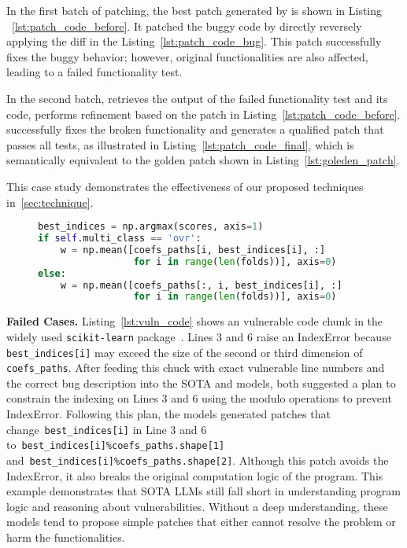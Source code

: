 In the first batch of patching, the best patch generated by \sys is shown in Listing ~\ref{lst:patch_code_before}. It patched the buggy code by directly reversely applying the diff in the Listing~\ref{lst:patch_code_bug}.
This patch successfully fixes the buggy behavior; however, original functionalities are also affected, leading to a failed functionality test.

In the second batch, \sys retrieves the output of the failed functionality test and its code, performs refinement based on the patch in Listing~\ref{lst:patch_code_before}. \sys successfully fixes the broken functionality and generates a qualified patch that passes all tests, as illustrated in Listing~\ref{lst:patch_code_final}, which is semantically equivalent to the golden patch shown in Listing~\ref{lst:goleden_patch}. 

This case study demonstrates the effectiveness of our proposed techniques in~\cref{sec:technique}.


\begin{wrapfigure}{r}{0.7\textwidth}
\vspace{-20pt}
\begin{adjustbox}{width=0.7\textwidth}
\hspace*{50pt}%
\begin{lstlisting}[language=Python, caption={Example of a vulnerable code chuck.}, label={lst:vuln_code}]
best_indices = np.argmax(scores, axis=1)
if self.multi_class == 'ovr':
    w = np.mean([coefs_paths[i, best_indices[i], :]
                 for i in range(len(folds))], axis=0)
else:
    w = np.mean([coefs_paths[:, i, best_indices[i], :]
                 for i in range(len(folds))], axis=0)
\end{lstlisting}
\end{adjustbox}
\end{wrapfigure}


\vspace{10pt}
\noindent\textbf{Failed Cases.} 
Listing~\ref{lst:vuln_code} shows an vulnerable code chunk in the widely used {\tt scikit-learn} package~\cite{pedregosa2011scikit}.
Lines 3 and 6 raise an IndexError because \texttt{best\_indices[i]} may exceed the size of the second or third dimension of \texttt{coefs\_paths}.
After feeding this chuck with exact vulnerable line numbers and the correct bug description into the SOTA \gpt and \claude models, both suggested a plan to constrain the indexing on Lines 3 and 6 using the modulo operations to prevent IndexError.
Following this plan, the models generated patches that change~\texttt{best\_indices[i]} in Line 3 and 6 to~\texttt{best\_indices[i]\%coefs\_paths.shape[1]} and~\texttt{best\_indices[i]\%coefs\_paths.shape[2]}. 
Although this patch avoids the IndexError, it also breaks the original computation logic of the program.
This example demonstrates that SOTA LLMs still fall short in understanding program logic and reasoning about vulnerabilities. 
Without a deep understanding, these models tend to propose simple patches that either cannot resolve the problem or harm the functionalities.



